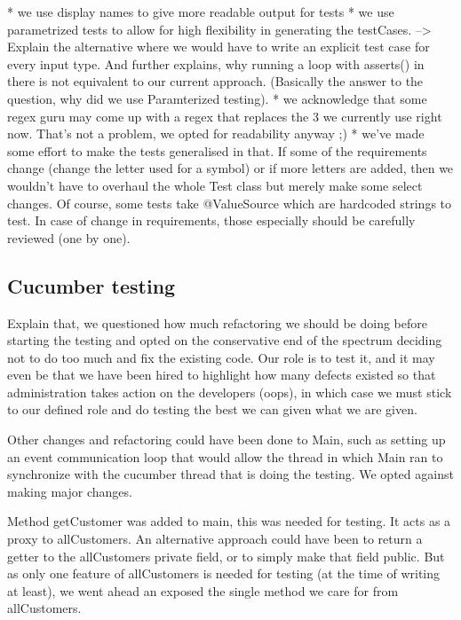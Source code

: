 \documentclass[11pt]{article}
\begin{document}
* we use display names to give more readable output for tests
* we use parametrized tests to allow for high flexibility in generating the testCases. --> Explain the alternative where we would have to write an explicit test case for every input type. And further explains, why running a loop with asserts() in there is not equivalent to our current approach. (Basically the answer to the question, why did we use Paramterized testing). 
* we acknowledge that some regex guru may come up with a regex that replaces the 3 we currently use right now. That's not a problem, we opted for readability anyway ;) 
* we've made some effort to make the tests generalised in that. If some of the requirements change (change the letter used for a symbol) or if more letters are added, then we wouldn't have to overhaul the whole Test class but merely make some select changes. Of course, some tests take @ValueSource which are hardcoded strings to test. In case of change in requirements, those especially should be carefully reviewed (one by one). 


\subsection{Cucumber testing}

Explain that, we questioned how much refactoring we should be doing before starting the testing and opted on the conservative end of the spectrum deciding not to do too much and fix the existing code. Our role is to test it, and it may even be that we have been hired to highlight how many defects existed so that administration takes action on the developers (oops), in which case we must stick to our defined role and do testing the best we can given what we are given. 

Other changes and refactoring could have been done to Main, such as setting up an event communication loop that would allow the thread in which Main ran to synchronize with the cucumber thread that is doing the testing. We opted against making major changes. 

Method getCustomer was added to main, this was needed for testing. It acts as a proxy to allCustomers. An alternative approach could have been to return a getter to the allCustomers private field, or to simply make that field public. But as only one feature of allCustomers is needed for testing (at the time of writing at least), we went ahead an exposed the single method we care for from allCustomers. 
\end{document}
